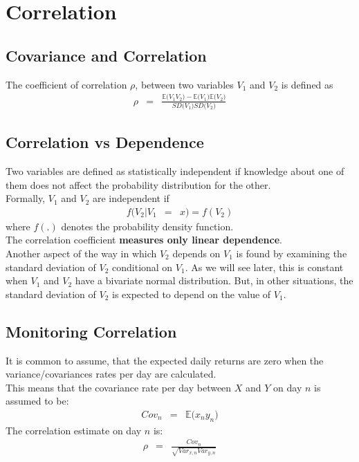 \chapter{Correlation}

\section{Covariance and Correlation}
The coefficient of correlation $\rho$, between two variables $V_{1}$ and $V_{2}$ is defined as
\begin{eqnarray}
	\rho &=& \frac{\mathbb{E}\big(V_{1}V_{2}\big) - \mathbb{E}\big(V_{1}\big)\mathbb{E}\big(V_{2}\big)}{SD\big(V_{1}\big)SD\big(V_{2}\big)}
\end{eqnarray}

\section{Correlation vs Dependence}
Two variables are defined as statistically independent if knowledge about one of them does not affect the probability distribution for the other.\\
Formally, $V_{1}$ and $V_{2}$ are independent if
\begin{eqnarray}
	f(V_{2}\bigr\rvert V_{1} &=& x) = f(V_{2})
\end{eqnarray}
where $f(.)$ denotes the probability density function.\\
The correlation coefficient \textbf{\color{blue}measures only linear dependence}.\\
Another aspect of the way in which $V_{2}$ depends on $V_{1}$ is found by examining the standard deviation of $V_{2}$ conditional on $V_{1}$. As we will see later, this is constant when $V_{1}$ and $V_{2}$ have a bivariate normal distribution. But, in other situations, the standard deviation of $V_{2}$ is expected to depend on the value of $V_{1}$.

\section{Monitoring Correlation}
It is common to assume, that the expected daily returns are zero when the variance/covariances rates per day are calculated.\\
This means that the covariance rate per day between $X$ and $Y$ on day $n$ is assumed to be:
\begin{eqnarray}
	Cov_{n} &=& \mathbb{E}\big(x_{n}y_{n}\big)
\end{eqnarray}
The correlation estimate on day $n$ is:
\begin{eqnarray}
	\rho &=& \frac{Cov_{n}}{\sqrt{Var_{x, n} Var_{y, n}}}
\end{eqnarray}

